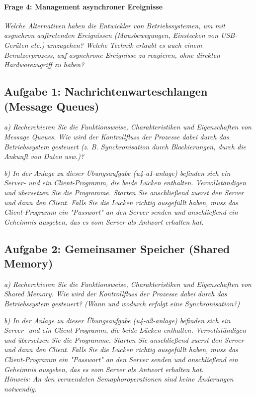 \documentclass[a4paper]{article}
\begin{document}
\vspace{10mm}
\paragraph{Frage 4: Management asynchroner Ereignisse}
\textit{Welche Alternativen haben die Entwickler von Betriebssystemen, um mit asynchron auftretenden
    Ereignissen (Mausbewegungen, Einstecken von USB-Geräten etc.) umzugehen? Welche Technik
    erlaubt es auch einem Benutzerprozess, auf asynchrone Ereignisse zu reagieren, ohne direkten
    Hardwarezugriff zu haben?}

\subsection{Aufgabe 1: Nachrichtenwarteschlangen (Message Queues)}
\textit{a) Recherchieren Sie die Funktionsweise, Charakteristiken und Eigenschaften von Message Queues. Wie wird der Kontrollfluss der Prozesse dabei durch das Betriebssystem gesteuert (z. B. Synchronisation durch Blockierungen, durch die Ankunft von Daten usw.)?}
\vspace{10mm}

\textit{b) In der Anlage zu dieser Übungsaufgabe (u4-a1-anlage) befinden sich ein Server- und ein Client-Programm, die beide Lücken enthalten. Vervollständigen und übersetzen Sie die Programme. Starten Sie anschließend zuerst den Server und dann den Client. Falls Sie die Lücken richtig ausgefüllt haben, muss das Client-Programm ein "Passwort" an den Server senden und anschließend ein Geheimnis ausgeben, das es vom Server als Antwort erhalten hat.}
\vspace{10mm}

\subsection{Aufgabe 2: Gemeinsamer Speicher (Shared Memory)}
\textit{a) Recherchieren Sie die Funktionsweise, Charakteristiken und Eigenschaften von Shared Memory. Wie wird der Kontrollfluss der Prozesse dabei durch das Betriebssystem gesteuert? (Wann und wodurch erfolgt eine Synchronisation?)}
\vspace{10mm}

\textit{b) In der Anlage zu dieser Übungsaufgabe (u4-a2-anlage) befinden sich ein Server- und ein Client-Programm, die beide Lücken enthalten. Vervollständigen und übersetzen Sie die Programme. Starten Sie anschließend zuerst den Server und dann den Client. Falls Sie die Lücken richtig ausgefüllt haben, muss das Client-Programm ein "Passwort" an den Server senden und anschließend ein Geheimnis ausgeben, das es vom Server als Antwort erhalten hat.\\
    Hinweis: An den verwendeten Semaphoroperationen sind keine Änderungen notwendig.}
\vspace{10mm}
\end{document}
